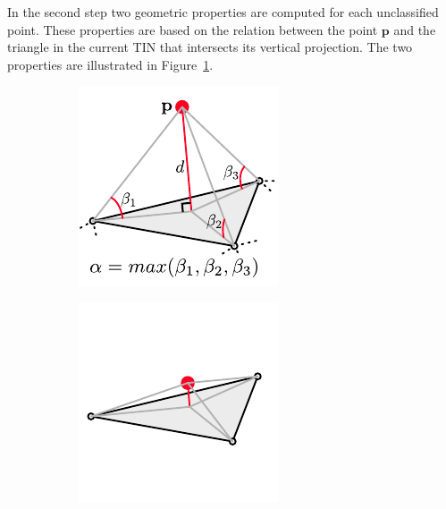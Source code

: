 In the second step two geometric properties are computed for each unclassified point.
These properties are based on the relation between the point $\mathbf{p}$ and the triangle in the current TIN that intersects its vertical projection. The two properties are illustrated in Figure~\ref{fig:ground-filtering:symbols}.
\begin{figure}[htb]
  \centering
  \begin{subfigure}[b]{0.3\linewidth}
    \centering
    \includegraphics[width=\textwidth]{figs/groundfilter-symbols.pdf}
    \caption{}
    \label{fig:ground-filtering:symbols}
  \end{subfigure}
  \begin{subfigure}[b]{0.3\linewidth}
    \centering
    \includegraphics[width=\textwidth]{figs/groundfilter-ground.pdf}

\end{subfigure}
\end{figure}

